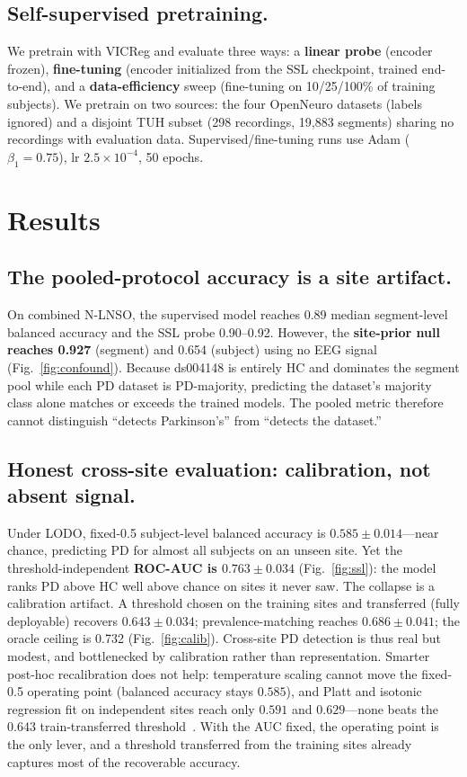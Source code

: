 \documentclass[runningheads]{llncs}
\begin{document}
\subsection{Self-supervised pretraining.}
We pretrain with VICReg and evaluate three ways: a \textbf{linear probe} (encoder frozen), \textbf{fine-tuning} (encoder initialized from the SSL checkpoint, trained end-to-end), and a \textbf{data-efficiency} sweep (fine-tuning on 10/25/100\% of training subjects). We pretrain on two sources: the four OpenNeuro datasets (labels ignored) and a disjoint TUH subset (298 recordings, 19{,}883 segments) sharing no recordings with evaluation data. Supervised/fine-tuning runs use Adam ($\beta_1{=}0.75$), lr $2.5\times10^{-4}$, 50 epochs.

\section{Results}

\subsection{The pooled-protocol accuracy is a site artifact.}\label{sec:confound}
On combined N-LNSO, the supervised model reaches 0.89 median segment-level balanced accuracy and the SSL probe 0.90--0.92. However, the \textbf{site-prior null reaches 0.927} (segment) and 0.654 (subject) using no EEG signal (Fig.~\ref{fig:confound}). Because ds004148 is entirely HC and dominates the segment pool while each PD dataset is PD-majority, predicting the dataset's majority class alone matches or exceeds the trained models. The pooled metric therefore cannot distinguish ``detects Parkinson's'' from ``detects the dataset.''

\subsection{Honest cross-site evaluation: calibration, not absent signal.}
Under LODO, fixed-0.5 subject-level balanced accuracy is $0.585\pm0.014$---near chance, predicting PD for almost all subjects on an unseen site. Yet the threshold-independent \textbf{ROC-AUC is $0.763\pm0.034$} (Fig.~\ref{fig:ssl}): the model ranks PD above HC well above chance on sites it never saw. The collapse is a calibration artifact. A threshold chosen on the training sites and transferred (fully deployable) recovers $0.643\pm0.034$; prevalence-matching reaches $0.686\pm0.041$; the oracle ceiling is 0.732 (Fig.~\ref{fig:calib}). Cross-site PD detection is thus real but modest, and bottlenecked by calibration rather than representation. Smarter post-hoc recalibration does not help: temperature scaling cannot move the fixed-0.5 operating point (balanced accuracy stays $0.585$), and Platt and isotonic regression fit on independent sites reach only $0.591$ and $0.629$---none beats the $0.643$ train-transferred threshold~\cite{guo2017calibration,zadrozny2002}. With the AUC fixed, the operating point is the only lever, and a threshold transferred from the training sites already captures most of the recoverable accuracy.
\end{document}
